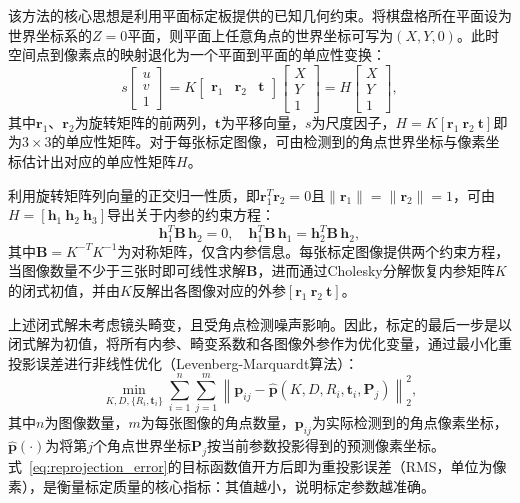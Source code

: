 该方法的核心思想是利用平面标定板提供的已知几何约束。将棋盘格所在平面设为世界坐标系的$Z=0$平面，则平面上任意角点的世界坐标可写为$(X, Y, 0)$。此时空间点到像素点的映射退化为一个平面到平面的单应性变换：
\begin{equation}
    s
    \begin{bmatrix} u \\ v \\ 1 \end{bmatrix}
    = K
    \begin{bmatrix} \mathbf{r}_1 & \mathbf{r}_2 & \mathbf{t} \end{bmatrix}
    \begin{bmatrix} X \\ Y \\ 1 \end{bmatrix}
    = H
    \begin{bmatrix} X \\ Y \\ 1 \end{bmatrix},
    \label{eq:homography}
\end{equation}
其中$\mathbf{r}_1$、$\mathbf{r}_2$为旋转矩阵的前两列，$\mathbf{t}$为平移向量，$s$为尺度因子，$H=K[\mathbf{r}_1\ \mathbf{r}_2\ \mathbf{t}]$即为$3\times3$的单应性矩阵。对于每张标定图像，可由检测到的角点世界坐标与像素坐标估计出对应的单应性矩阵$H$。

利用旋转矩阵列向量的正交归一性质，即$\mathbf{r}_1^{T}\mathbf{r}_2=0$且$\|\mathbf{r}_1\|=\|\mathbf{r}_2\|=1$，可由$H=[\mathbf{h}_1\ \mathbf{h}_2\ \mathbf{h}_3]$导出关于内参的约束方程：
\begin{equation}
    \mathbf{h}_1^{T}\mathbf{B}\,\mathbf{h}_2 = 0,
    \quad
    \mathbf{h}_1^{T}\mathbf{B}\,\mathbf{h}_1 = \mathbf{h}_2^{T}\mathbf{B}\,\mathbf{h}_2,
    \label{eq:zhang_constraint}
\end{equation}
其中$\mathbf{B}=K^{-T}K^{-1}$为对称矩阵，仅含内参信息。每张标定图像提供两个约束方程，当图像数量不少于三张时即可线性求解$\mathbf{B}$，进而通过Cholesky分解恢复内参矩阵$K$的闭式初值，并由$K$反解出各图像对应的外参$[\mathbf{r}_1\ \mathbf{r}_2\ \mathbf{t}]$。

上述闭式解未考虑镜头畸变，且受角点检测噪声影响。因此，标定的最后一步是以闭式解为初值，将所有内参、畸变系数和各图像外参作为优化变量，通过最小化重投影误差进行非线性优化（Levenberg-Marquardt算法）：
\begin{equation}
    \min_{K,D,\{R_i,\mathbf{t}_i\}}
    \sum_{i=1}^{n}\sum_{j=1}^{m}
    \left\|
    \mathbf{p}_{ij} - \hat{\mathbf{p}}\left(K, D, R_i, \mathbf{t}_i, \mathbf{P}_j\right)
    \right\|_2^2,
    \label{eq:reprojection_error}
\end{equation}
其中$n$为图像数量，$m$为每张图像的角点数量，$\mathbf{p}_{ij}$为实际检测到的角点像素坐标，$\hat{\mathbf{p}}(\cdot)$为将第$j$个角点世界坐标$\mathbf{P}_j$按当前参数投影得到的预测像素坐标。式~\eqref{eq:reprojection_error}的目标函数值开方后即为重投影误差（RMS，单位为像素），是衡量标定质量的核心指标：其值越小，说明标定参数越准确。


